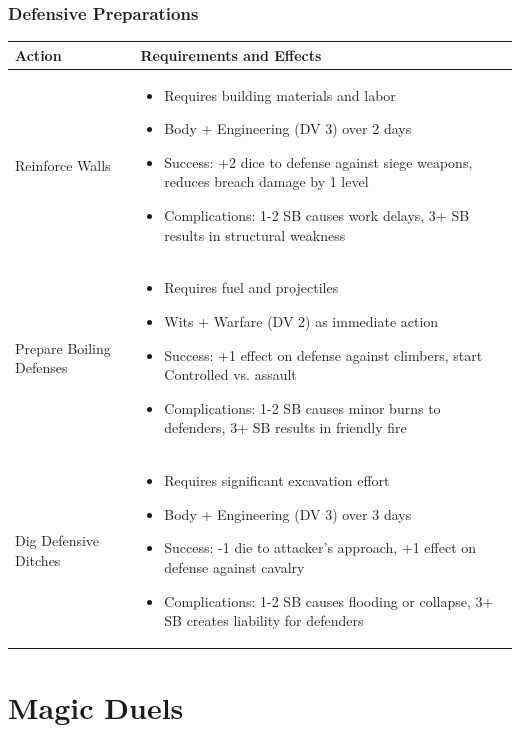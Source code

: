 \documentclass[11pt,letterpaper]{article}
\begin{document}
\subsubsection{Defensive Preparations}

\begin{longtable}{|>{\raggedright\arraybackslash}p{4cm}|>{\raggedright\arraybackslash}p{8cm}|}
\hline
\textbf{Action} & \textbf{Requirements and Effects} \\
\hline
Reinforce Walls & 
\begin{itemize}
    \item Requires building materials and labor
    \item Body + Engineering (DV 3) over 2 days
    \item Success: +2 dice to defense against siege weapons, reduces breach damage by 1 level
    \item Complications: 1-2 SB causes work delays, 3+ SB results in structural weakness
\end{itemize} \\
\hline
Prepare Boiling Defenses & 
\begin{itemize}
    \item Requires fuel and projectiles
    \item Wits + Warfare (DV 2) as immediate action
    \item Success: +1 effect on defense against climbers, start Controlled vs. assault
    \item Complications: 1-2 SB causes minor burns to defenders, 3+ SB results in friendly fire
\end{itemize} \\
\hline
Dig Defensive Ditches & 
\begin{itemize}
    \item Requires significant excavation effort
    \item Body + Engineering (DV 3) over 3 days
    \item Success: -1 die to attacker's approach, +1 effect on defense against cavalry
    \item Complications: 1-2 SB causes flooding or collapse, 3+ SB creates liability for defenders
\end{itemize} \\
\hline
\end{longtable}

\newpage

\section{Magic Duels}
\end{document}
